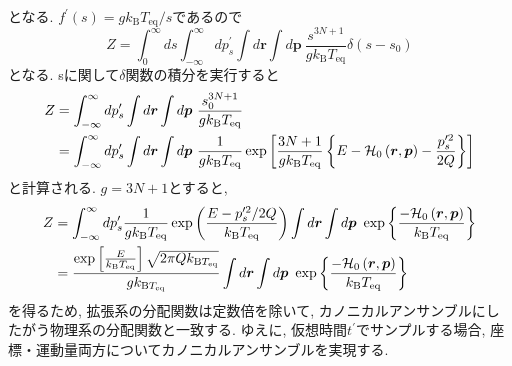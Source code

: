 となる. $f^{\prime}(s)=g k_{\mathrm{B}} T_{\mathrm{eq}} / s$であるので
\begin{equation}
  Z
  = \int_{0}^{\infty} ds \int_{- \infty}^{\infty} dp^{\prime}_{s}
  \int d \bm{r} \int d \bm{p} ~
  \frac{s^{3N+1}}{g k_{\mathrm{B}} T_{\mathrm{eq}}}
  \delta (s - s_{0})
 \label{eq:NoseHoover19}
\end{equation}
となる. sに関して$\delta$関数の積分を実行すると
\begin{align}
  Z
 &= \int_{- \infty}^{\infty} dp^{\prime}_{s} \int d \bm{r} \int d \bm{p} ~
 \frac{s_{0}^{3N+1}}{g k_{\mathrm{B}} T_{\mathrm{eq}}}
 \notag
 \\
 &= \int_{- \infty}^{\infty} dp^{\prime}_{s} \int d \bm{r} \int d \bm{p} ~
    \frac{1}{g k_{\mathrm{B}} T_{\mathrm{eq}}}
     \exp \left[
          \frac{3N+1}{g k_{\mathrm{B}} T_{\mathrm{eq}}}
          \left\{
	   E - \mathcal{H}_{0} \left(\bm{r}, \bm{p} \right)
	   - \frac{p^{\prime 2}_{s}}{2Q}
           \right\}
           \right]
 \label{eq:NoseHoover20}
\end{align}
と計算される. $g=3N+1$とすると,
\begin{align}
 Z
&= \int_{- \infty}^{\infty} dp^{\prime}_{s}
   \frac{1}{g k_{\mathrm{B}} T_{\mathrm{eq}}}
   \exp \left(
               \frac{E - p^{\prime 2}_{s}/2Q}{k_{\mathrm{B}} T_{\mathrm{eq}}}
         \right)
   \int d \bm{r} \int d \bm{p} ~
   \exp \left\{
               \frac{- \mathcal{H}_{0} \left(\bm{r}, \bm{p} \right) }
	       {k_{\mathrm{B}} T_{\mathrm{eq}}}
	\right\}
 \notag
 \\
&= \frac{ \exp\left[\frac{E}{k_{\mathrm{B}} T_{\mathrm{eq}}}\right]
          \sqrt{2\pi Q k_{\mathrm{B}T_{\mathrm{eq}}}}}
        {g k_{\mathrm{B}T_{\mathrm{eq}}}}
   \int d \bm{r} \int d \bm{p} ~
   \exp \left\{
               \frac{- \mathcal{H}_{0} \left(\bm{r}, \bm{p} \right) }
	       {k_{\mathrm{B}} T_{\mathrm{eq}}}
	\right\}
 \label{eq:NoseHoover21}
\end{align}
を得るため, 拡張系の分配関数は定数倍を除いて, カノニカルアンサンブルにしたがう物理系の分配関数と一致する.
ゆえに, 仮想時間$t^{\prime}$でサンプルする場合, 座標・運動量両方についてカノニカルアンサンブルを実現する.

